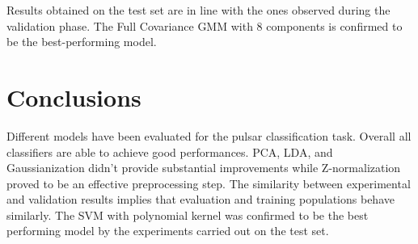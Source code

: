 \documentclass[12pt,a4paper]{article}
\begin{document}
\vspace{20pt}
Results obtained on the test set are in line with the ones observed during the validation phase.
The Full Covariance GMM with 8 components is confirmed to be the best-performing model.

\section{Conclusions}

Different models have been evaluated for the pulsar classification task. Overall all classifiers are able to achieve good performances.
PCA, LDA, and Gaussianization didn't provide substantial improvements while Z-normalization proved to be an effective preprocessing step.
The similarity between experimental and validation results implies that evaluation and training populations behave similarly.
The SVM with polynomial kernel was confirmed to be the best performing model by the experiments carried out on the test set.



\end{document}
